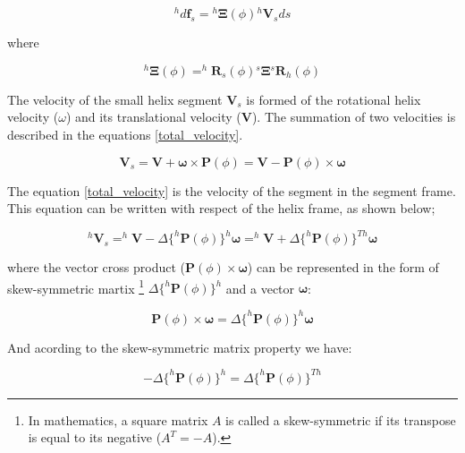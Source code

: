 \documentclass[12pt,a4paper,titlepage]{report}
\begin{document}
\begin{equation}
 ^{h}d\bm{f}_s = {^{h}\bm{\Xi}}(\phi){^{h}\bm{V}_s}{ds}
\label{velocity_force_helix_frame}
\end{equation}

where


\begin{equation}
{^{h}\bm{\Xi}}(\phi) = ^{h}\bm{R}_s(\phi){^{s}\bm{\Xi}}{^{s}\bm{R}_h(\phi)}
\label{drag_coeff_matrix_rotated}
\end{equation}

The velocity of the small helix segment $\bm{V}_s$ is formed of the rotational helix velocity ($\omega$) 
and its translational velocity ($\bm{V}$). The summation of two velocities is described in the equations
\ref{total_velocity}.

\begin{equation}
\bm{V}_s = \bm{V} + \bm{\omega} \times {\bm{P}(\phi)} = \bm{V} - {\bm{P}(\phi)}\times{\bm{\omega}}
\label{total_velocity}
\end{equation}

The equation \ref{total_velocity} is the velocity of the segment in the segment frame. 
This equation can be written with respect of the helix frame, as shown below;

\begin{equation}
^{h}\bm{V}_s = ^{h}\bm{V} - \Delta{\{^{h}\bm{P}(\phi)}\}^{h}\bm{\omega} = ^{h}\bm{V} + \Delta{\{^{h}\bm{P}(\phi)}\}^{Th}\bm{\omega}
\label{total_velocity_helixFrame}
\end{equation}

where the vector cross product (${\bm{P}(\phi)}\times{\bm{\omega}}$) can be represented in the form 
of skew-symmetric
martix \footnote{In mathematics, a square matrix $A$ is called a skew-symmetric if its transpose
is equal to its negative ($A^{T} = -A$).} $\Delta{\{^{h}\bm{P}(\phi)}\}^{h}$ and a vector
$\bm{\omega}$:

\begin{equation}
{\bm{P}(\phi)}\times{\bm{\omega}} = \Delta{\{^{h}\bm{P}(\phi)}\}^{h}{\bm{\omega}}
\label{cross_product}
\end{equation}

And acording to the skew-symmetric matrix property we have:

\begin{equation}
-\Delta{\{^{h}\bm{P}(\phi)}\}^{h} = \Delta{\{^{h}\bm{P}(\phi)}\}^{Th}
\label{skew_symetric_vector}
\end{equation}
\end{document}
